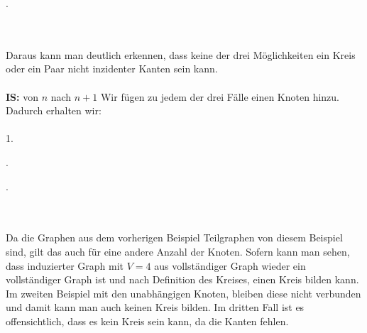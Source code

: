         .
        \\\\
        Daraus kann man deutlich erkennen, dass keine der drei Möglichkeiten ein Kreis oder ein Paar 
        nicht inzidenter Kanten sein kann.\\\\
        \textbf{IS:} von $n$ nach $n + 1$
        Wir fügen zu jedem der drei Fälle einen Knoten hinzu. Dadurch erhalten wir:\\\\
        1. 
        .
        .
        \\\\
        Da die Graphen aus dem vorherigen Beispiel Teilgraphen von diesem Beispiel sind, gilt das auch 
        für eine andere Anzahl der Knoten. %
        Sofern kann man sehen, dass induzierter Graph mit $V=4$ aus vollständiger Graph wieder ein 
        vollständiger Graph ist und nach Definition des Kreises, einen Kreis bilden kann. Im zweiten 
        Beispiel mit den unabhängigen Knoten, bleiben diese nicht verbunden und damit kann man auch keinen 
        Kreis bilden. Im dritten Fall ist es offensichtlich, dass es kein Kreis sein kann, da die Kanten fehlen. 

